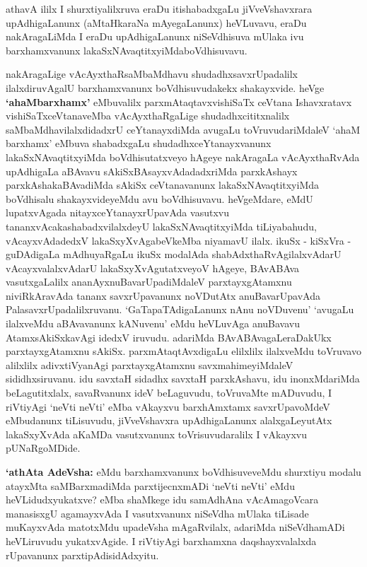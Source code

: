 \centerline{}

\begin{artha}
athavA ililx I shurxtiyalilxruva eraDu itishabadxgaLu jiVveVshavxrara
upAdhigaLanunx (aMtaHkaraNa mAyegaLanunx) heVLuvavu, eraDu
nakAragaLiMda I eraDu upAdhigaLanunx niSeVdhisuva mUlaka ivu
barxhamxvanunx lakaSxNAvaqtitxyiMda\break boVdhisuvavu.

nakAragaLige vAcAyxthaRsaMbaMdhavu shudadhxsavxrUpadalilx
ilalxdiruvAgalU barxhamxvanunx boVdhisuvudakekx shakayxvide. heVge
\textbf{`ahaMbarxhamx'} eMbuvalilx parxmAtaqtavxvishiSaTx ceVtana Ishavxratavx
vishiSaTxceVtanaveMba vAcAyxthaRgaLige shudadhxcititxnalilx
saMbaMdhavilalxdidadxrU ceYtanayxdiMda avugaLu toVruvudariMdaleV `ahaM
barxhamx' eMbuva shabadxgaLu shudadhxceYtanayxvanunx
lakaSxNAvaqtitxyiMda boVdhisutatxveyo hAgeye nakAragaLa vAcAyxthaRvAda
upAdhigaLa aBAvavu sAkiSxBAsayxvAdadadxriMda parxkAshayx
parxkAshakaBAvadiMda sAkiSx ceVtanavanunx lakaSxNAvaqtitxyiMda
boVdhisalu shakayxvideyeMdu avu boVdhisuvavu. heVgeMdare,
eMdU lupatxvAgada nitayxceYtanayxrUpavAda vasutxvu
tananxvAcakashabadxvilalxdeyU lakaSxNAvaqtitxyiMda tiLiyabahudu,
vAcayxvAdadedxV lakaSxyXvAgabeVkeMba niyamavU ilalx. ikuSx - kiSxVra -
guDAdigaLa mAdhuyaRgaLu ikuSx modalAda shabAdxthaRvAgilalxvAdarU vAcayxvalalxvAdarU lakaSxyXvAgutatxveyoV hAgeye, BAvABAva
vasutxgaLalilx ananAyxnuBavarUpadiMdaleV parxtayxgAtamxnu
niviRkAravAda tananx savxrUpavanunx noVDutAtx anuBavarUpavAda
PalasavxrUpadalilxruvanu. `GaTapaTAdigaLanunx nAnu noVDuvenu'
`avugaLu ilalxveMdu aBAvavanunx kANuvenu' eMdu heVLuvAga anuBavavu
AtamxsAkiSxkavAgi idedxV iruvudu. adariMda BAvABAvagaLeraDakUkx
parxtayxgAtamxnu sAkiSx. parxmAtaqtAvxdigaLu elilxlilx ilalxveMdu
toVruvavo alilxlilx adivxtiVyanAgi parxtayxgAtamxnu savxmahimeyiMdaleV
sididhxsiruvanu. idu savxtaH sidadhx savxtaH parxkAshavu, idu
inonxMdariMda beLagutitxlalx, savaRvanunx ideV beLaguvudu, toVruvaMte
mADuvudu, I riVtiyAgi `neVti neVti' eMba vAkayxvu barxhAmxtamx
savxrUpavoMdeV eMbudanunx tiLisuvudu, jiVveVshavxra upAdhigaLanunx
alalxgaLeyutAtx lakaSxyXvAda aKaMDa vasutxvanunx toVrisuvudaralilx I
vAkayxvu pUNaRgoMDide.

\textbf{`athAta AdeVsha:} eMdu barxhamxvanunx boVdhisuveveMdu shurxtiyu modalu
atayxMta saMBarxmadiMda parxtijecnxmADi `neVti neVti' eMdu heVLidudxyukatxve? eMba shaMkege
idu samAdhAna \ndash vAcAmagoVcara manasisxgU agamayxvAda I vasutxvanunx
niSeVdha mUlaka tiLisade muKayxvAda matotxMdu upadeVsha mAgaRvilalx,
adariMda niSeVdhamADi heVLiruvudu yukatxvAgide. I riVtiyAgi barxhamxna
daqshayxvalalxda rUpavanunx parxtipAdisidAdxyitu.
\end{artha}

